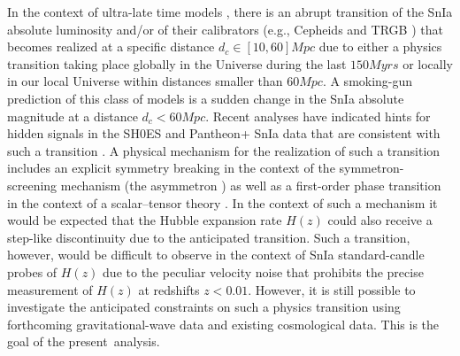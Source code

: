 \documentclass[universe,article,accept,moreauthors,pdftex]{Definitions/mdpi}
\begin{document}
In the context of ultra-late time models \cite{Alestas:2021nmi,Alestas:2022xxm,Perivolaropoulos:2021bds,Perivolaropoulos:2022khd}, there is an abrupt transition of the SnIa absolute luminosity and/or of their calibrators (e.g., Cepheids and TRGB \cite{Perivolaropoulos:2021bds}) that becomes realized at a specific distance $d_c\in [10,60]Mpc$ due to either a  physics transition taking place globally in the Universe during the last $150Myrs$ or locally in our local Universe within distances smaller than $60Mpc$. A smoking-gun prediction of this class of models is a sudden change in the SnIa absolute magnitude at a distance $d_c<60Mpc$. Recent analyses have indicated hints for hidden signals in the SH0ES \cite{Perivolaropoulos:2022khd} and Pantheon+ SnIa data that are consistent with such a transition \cite{Perivolaropoulos:2023iqj}. A physical mechanism for the realization of such a transition includes an explicit symmetry breaking in the context of the symmetron-screening mechanism (the asymmetron \cite{Perivolaropoulos:2022txg}) as well as a first-order phase transition in the context of a scalar--tensor theory \cite{Lee:2006vka}. In the context of such a mechanism it would be expected that the Hubble expansion rate $H(z)$ could also receive a step-like discontinuity due to the anticipated transition. Such a transition, however, would be difficult to observe in the context of SnIa standard-candle probes of $H(z)$ due to the peculiar velocity noise that prohibits the precise measurement of $H(z)$ at redshifts $z<0.01$. However, it is still possible to investigate the anticipated constraints on such a physics transition using forthcoming gravitational-wave data and existing cosmological data. This is the goal of the present~analysis.
\end{document}
